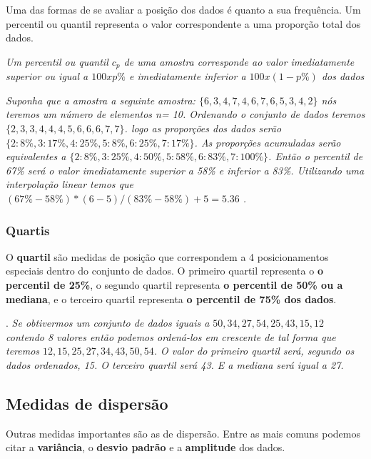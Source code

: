 Uma das formas de se avaliar a posição dos dados é quanto a sua frequência. Um percentil ou quantil representa o valor correspondente a uma proporção total dos dados.

\begin{definition}
\textit{Um percentil ou quantil $c_{p}$ de uma amostra corresponde ao valor imediatamente superior ou igual a $100xp\%$ e imediatamente inferior a $100x(1-p\%)$ dos dados} 
\end{definition}

\begin{proposition}
\textit{Suponha que a amostra a seguinte amostra: $\{6,3,4,7,4,6,7,6,5,3,4,2\}$ nós teremos um número de elementos n= 10. Ordenando o conjunto de dados teremos $\{2,3,3,4,4,4,5,6,6,6,7,7\}$. logo as proporções dos dados serão $\{2:8\% , 3:17\%, 4:25\%, 5:8\%, 6:25\%, 7:17\%\}$. As proporções acumuladas serão equivalentes a $\{2:8\% , 3:25\%, 4:50\%, 5:58\%, 6:83\%, 7:100\%\}$. Então o percentil de 67\% será o valor imediatamente superior a 58\% e inferior a 83\%. Utilizando uma interpolação linear temos que $(67\%-58\%) * (6-5)/(83\%-58\%) + 5 =5.36$ .}
\end{proposition}

\subsubsection{Quartis} 

O \textbf{quartil} são medidas de posição que correspondem a 4 posicionamentos especiais dentro do conjunto de dados. O primeiro quartil representa o \textbf{o percentil de 25\%}, o segundo quartil representa \textbf{o percentil de 50\% ou a mediana}, e o terceiro quartil representa \textbf{o percentil de 75\% dos dados}. 

\begin{proposition}. 
\textit{Se obtivermos um conjunto de dados iguais a ${50,34,27,54,25,43,15,12}$ contendo 8 valores então podemos ordená-los em crescente de tal forma que teremos ${12,15,25,27,34,43,50,54}$. O valor do primeiro quartil será, segundo os dados ordenados, 15. O terceiro quartil será 43. E a mediana será igual a 27.}
\end{proposition} 

\subsection{Medidas de dispersão}

Outras medidas importantes são as de dispersão. Entre as mais comuns podemos citar a \textbf{variância}, o \textbf{desvio padrão} e a \textbf{amplitude} dos dados. 

